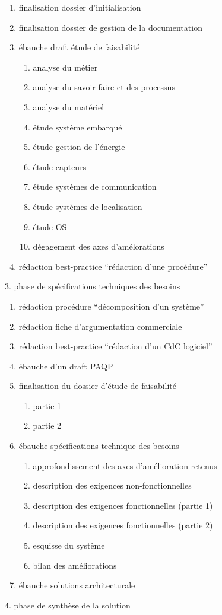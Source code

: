 \documentclass{article}
\begin{document}
\begin{enumerate}
\item finalisation dossier d’initialisation
\item finalisation dossier de gestion de la documentation
\item ébauche draft étude de faisabilité

\begin{enumerate}
\item analyse du métier
\item analyse du savoir faire et des processus
\item analyse du matériel
\item étude système embarqué
\item étude gestion de l’énergie
\item étude capteurs
\item étude systèmes de communication
\item étude systèmes de localisation
\item étude OS
\item dégagement des axes d’amélorations
\end{enumerate}
\item rédaction best-practice “rédaction d’une procédure”
\end{enumerate}
3. phase de spécifications techniques des besoins

\begin{enumerate}
\item rédaction procédure “décomposition d’un système”
\item rédaction fiche d’argumentation commerciale
\item rédaction best-practice “rédaction d’un CdC logiciel”
\item ébauche d’un draft PAQP
\item finalisation du dossier d’étude de faisabilité

\begin{enumerate}
\item partie 1
\item partie 2
\end{enumerate}
\item ébauche spécifications technique des besoins

\begin{enumerate}
\item approfondissement des axes d’amélioration retenus
\item description des exigences non-fonctionnelles
\item description des exigences fonctionnelles (partie 1)
\item description des exigences fonctionnelles (partie 2)
\item esquisse du système
\item bilan des améliorations
\end{enumerate}
\item ébauche solutions architecturale
\end{enumerate}
4. phase de synthèse de la solution
\end{document}
